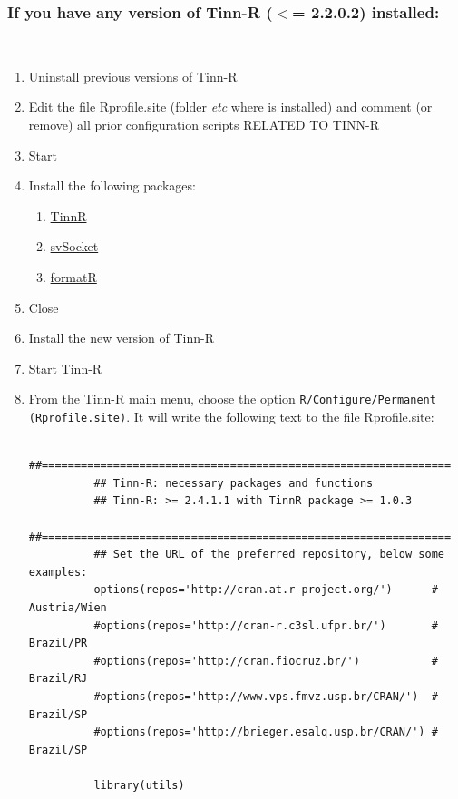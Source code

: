\subsubsection{If you have any version of Tinn-R ($<$= 2.2.0.2) installed:}\\

\begin{enumerate}
  \item Uninstall previous versions of Tinn-R
  \item Edit the file Rprofile.site (folder \textit{etc} where
    \RR{} is installed) and comment (or remove) all prior configuration
    scripts RELATED TO TINN-R
  \item Start \RR{}
  \item Install the following packages:
    \begin{enumerate}
      \item \href{http://cran.r-project.org/web/packages/TinnR/index.html}{TinnR}
      \item \href{http://cran.r-project.org/web/packages/svSocket/index.html}{svSocket}
      \item \href{http://cran.r-project.org/web/packages/formatR/index.html}{formatR}
    \end{enumerate}
  \item Close \RR{}
  \item Install the new version of Tinn-R
  \item Start Tinn-R
  \item From the Tinn-R main menu, choose the option
    \texttt{R/Configure/Permanent (Rprofile.site)}. It will write the
    following text to the file Rprofile.site:
    {\footnotesize
      {\color {darkred}
        \begin{verbatim}
          ##===============================================================
          ## Tinn-R: necessary packages and functions
          ## Tinn-R: >= 2.4.1.1 with TinnR package >= 1.0.3
          ##===============================================================
          ## Set the URL of the preferred repository, below some examples:
          options(repos='http://cran.at.r-project.org/')      # Austria/Wien
          #options(repos='http://cran-r.c3sl.ufpr.br/')       # Brazil/PR
          #options(repos='http://cran.fiocruz.br/')           # Brazil/RJ
          #options(repos='http://www.vps.fmvz.usp.br/CRAN/')  # Brazil/SP
          #options(repos='http://brieger.esalq.usp.br/CRAN/') # Brazil/SP

          library(utils)


\end{verbatim}}}
\end{enumerate}
